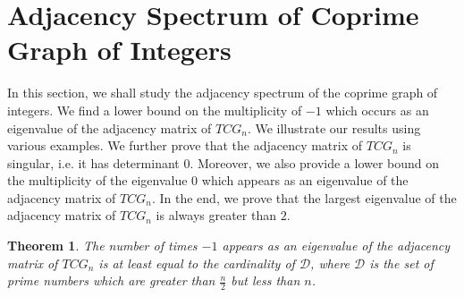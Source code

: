 \documentclass[12pt]{article}
\newtheorem{theorem}{Theorem}[section]
\begin{document}
	\section{Adjacency Spectrum of Coprime Graph of Integers}
	\label{S2}
	In this section, we shall study the adjacency spectrum of the coprime graph of integers. We find a lower bound on the multiplicity of $-1$ which occurs as an eigenvalue of the adjacency matrix of $TCG_n$.
	We illustrate our results using various examples.  We further prove that the adjacency matrix of $TCG_n$ is singular, i.e. it has determinant $0$. Moreover, we also provide a lower bound on the multiplicity of the eigenvalue $0$ which appears as an eigenvalue of the adjacency matrix of $TCG_n$.
	In the end, we prove that the largest eigenvalue of the adjacency matrix of $TCG_n$ is always greater than $2.$
	
	
	
	\begin{theorem}
		\label{number}
		The number of times $-1$ appears as an eigenvalue of the adjacency matrix of $TCG_n$ is at least equal to the cardinality of $\mathcal{D}$, where $\mathcal{D}$ is the set of prime numbers which are greater than $\frac{n}{2}$ but less than $n$. 
	\end{theorem}
	
\end{document}
